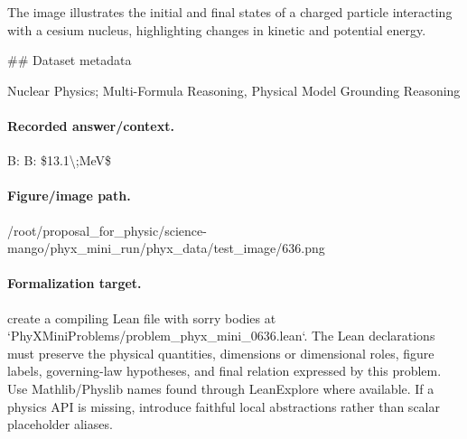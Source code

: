 The image illustrates the initial and final states of a charged particle interacting with a cesium nucleus, highlighting changes in kinetic and potential energy.

\#\# Dataset metadata

Nuclear Physics; Multi-Formula Reasoning, Physical Model Grounding Reasoning

\paragraph{Recorded answer/context.}
B: B: \$13.1\textbackslash{};MeV\$

\paragraph{Figure/image path.}
/root/proposal\_for\_physic/science-mango/phyx\_mini\_run/phyx\_data/test\_image/636.png

\paragraph{Formalization target.}
create a compiling Lean file with sorry bodies at `PhyXMiniProblems/problem\_phyx\_mini\_0636.lean`. The Lean declarations must preserve the physical quantities, dimensions or dimensional roles, figure labels, governing-law hypotheses, and final relation expressed by this problem.
Use Mathlib/Physlib names found through LeanExplore where available. If a physics API is missing, introduce faithful local abstractions rather than scalar placeholder aliases.

